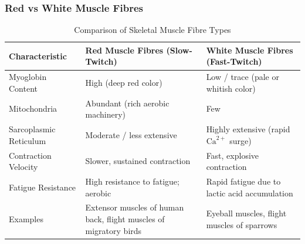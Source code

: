\documentclass[11pt,a4paper]{article}
\begin{document}
\subsubsection{Red vs White Muscle Fibres}
\begin{table}[h]
\centering
\small
\begin{tabularx}{\textwidth}{l X X}
\toprule
\textbf{Characteristic} & \textbf{Red Muscle Fibres (Slow-Twitch)} & \textbf{White Muscle Fibres (Fast-Twitch)} \\
\midrule
Myoglobin Content & High (deep red color) & Low / trace (pale or whitish color) \\
Mitochondria & Abundant (rich aerobic machinery) & Few \\
Sarcoplasmic Reticulum & Moderate / less extensive & Highly extensive (rapid $\text{Ca}^{2+}$ surge) \\
Contraction Velocity & Slower, sustained contraction & Fast, explosive contraction \\
Fatigue Resistance & High resistance to fatigue; aerobic & Rapid fatigue due to lactic acid accumulation \\
Examples & Extensor muscles of human back, flight muscles of migratory birds & Eyeball muscles, flight muscles of sparrows \\
\bottomrule
\end{tabularx}
\caption{Comparison of Skeletal Muscle Fibre Types}
\end{table}
\end{document}
